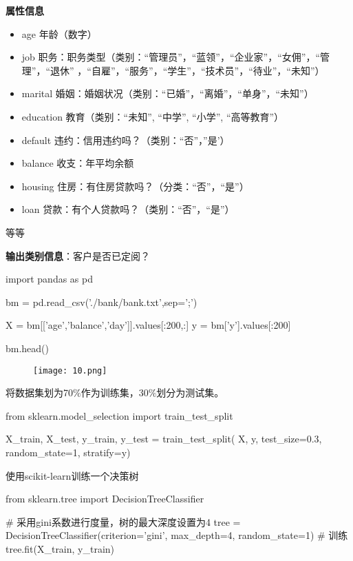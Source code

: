 \documentclass[12pt]{article}
\begin{document}
\textbf{属性信息}\\
\begin{itemize}
	\item age 年龄（数字）
	\item job 职务：职务类型（类别：“管理员”，“蓝领”，“企业家”，“女佣”，“管理”，“退休” ，“自雇”，“服务”，“学生”，“技术员”，“待业”，“未知”）
	\item marital 婚姻：婚姻状况（类别：“已婚”，“离婚”，“单身”，“未知”）
	\item education 教育（类别：“未知”, “中学”, “小学”, “高等教育”）
	\item default 违约：信用违约吗？（类别：“否”，”是’）
	\item balance 收支：年平均余额
	\item housing 住房：有住房贷款吗？（分类：“否”，“是”）
	\item loan 贷款：有个人贷款吗？（类别：“否”，“是”）
\end{itemize}
等等

\textbf{输出类别信息}：客户是否已定阅？
\begin{python}
import pandas as pd

bm = pd.read_csv('./bank/bank.txt',sep=';')


X = bm[['age','balance','day']].values[:200,:]
y = bm['y'].values[:200]

bm.head()
\end{python}

\begin{figure}[htbp]
	\centering
	\texttt{[image: 10.png]}
\end{figure}

将数据集划为70$\%$作为训练集，30$\%$划分为测试集。
\begin{python}
from sklearn.model_selection import train_test_split

X_train, X_test, y_train, y_test = train_test_split(
    X, y, test_size=0.3, random_state=1, stratify=y)
\end{python}

使用scikit-learn训练一个决策树

\begin{python}
from sklearn.tree import DecisionTreeClassifier

# 采用gini系数进行度量，树的最大深度设置为4
tree = DecisionTreeClassifier(criterion='gini', 
                              max_depth=4, 
                              random_state=1)
# 训练
tree.fit(X_train, y_train)	
\end{python}
\end{document}
